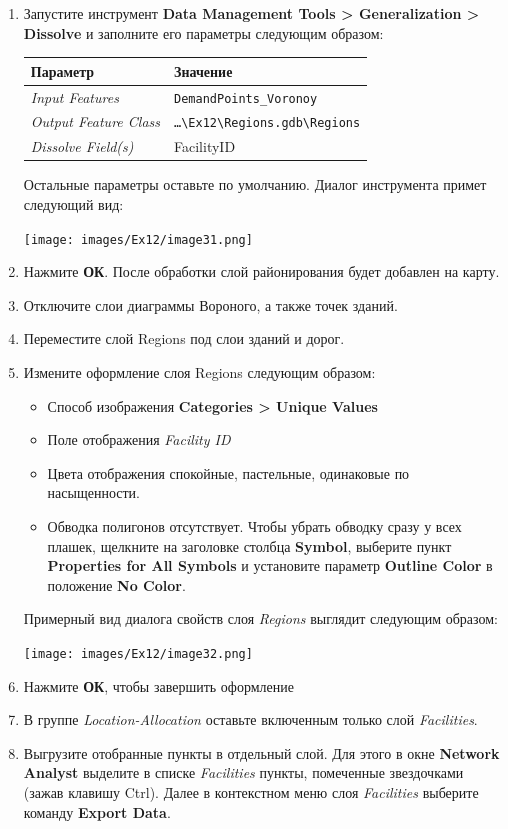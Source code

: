 \documentclass[12pt,]{book}
\begin{document}
\begin{enumerate}
\def\labelenumi{\arabic{enumi}.}
\item
  Запустите инструмент \textbf{Data Management Tools \textgreater{} Generalization \textgreater{} Dissolve} и заполните его параметры следующим образом:

  \begin{longtable}[]{@{}ll@{}}
  \toprule
  Параметр & Значение\tabularnewline
  \midrule
  \endhead
  \emph{Input Features} & \texttt{DemandPoints\_Voronoy}\tabularnewline
  \emph{Output Feature Class} & \texttt{\ldots{}\textbackslash{}Ex12\textbackslash{}Regions.gdb\textbackslash{}Regions}\tabularnewline
  \emph{Dissolve Field(s)} & FacilityID\tabularnewline
  \bottomrule
  \end{longtable}

  Остальные параметры оставьте по умолчанию. Диалог инструмента примет следующий вид:

  \texttt{[image: images/Ex12/image31.png]}
\item
  Нажмите \textbf{ОК}. После обработки слой районирования будет добавлен на карту.
\item
  Отключите слои диаграммы Вороного, а также точек зданий.
\item
  Переместите слой Regions под слои зданий и дорог.
\item
  Измените оформление слоя Regions следующим образом:

  \begin{itemize}
  \item
    Способ изображения \textbf{Categories \textgreater{} Unique Values}
  \item
    Поле отображения \emph{Facility ID}
  \item
    Цвета отображения спокойные, пастельные, одинаковые по насыщенности.
  \item
    Обводка полигонов отсутствует. Чтобы убрать обводку сразу у всех плашек, щелкните на заголовке столбца \textbf{Symbol}, выберите пункт \textbf{Properties for All Symbols} и установите параметр \textbf{Outline Color} в положение \textbf{No Color}.
  \end{itemize}

  Примерный вид диалога свойств слоя \emph{Regions} выглядит следующим образом:

  \texttt{[image: images/Ex12/image32.png]}
\item
  Нажмите \textbf{ОК}, чтобы завершить оформление
\item
  В группе \emph{Location-Allocation} оставьте включенным только слой \emph{Facilities}.
\item
  Выгрузите отобранные пункты в отдельный слой. Для этого в окне \textbf{Network Analyst} выделите в списке \emph{Facilities} пункты, помеченные звездочками (зажав клавишу Ctrl). Далее в контекстном меню слоя \emph{Facilities} выберите команду \textbf{Export Data}.


\end{enumerate}
\end{document}
